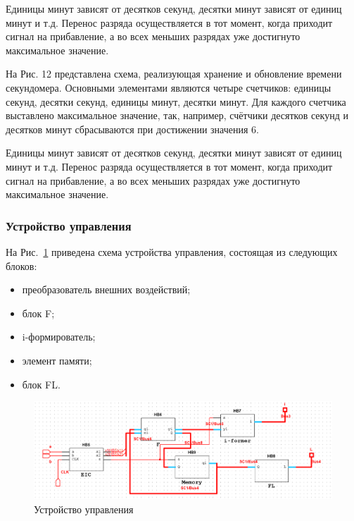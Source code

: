 \documentclass[a4paper, final]{article}
\begin{document}
\newpage

\newpage

Единицы минут зависят от десятков секунд, десятки минут зависят от единиц минут и т.д. Перенос разряда осуществляется в тот момент, когда приходит сигнал на прибавление, а во всех меньших разрядах уже достигнуто максимальное значение.

На Рис. 12 представлена схема, реализующая хранение и обновление времени секундомера. Основными элементами являются четыре счетчиков: единицы секунд, десятки секунд, единицы минут, десятки минут. Для каждого счетчика выставлено максимальное значение, так, например, счётчики десятков секунд и десятков минут сбрасываются при достижении значения 6.

\newpage

\newpage

Единицы минут зависят от десятков секунд, десятки минут зависят от единиц минут и т.д. Перенос разряда осуществляется в тот момент, когда приходит сигнал на прибавление, а во всех меньших разрядах уже достигнуто максимальное значение.

\subsubsection{Устройство управления}
На Рис.~\ref{img:control_device} приведена схема устройства управления, состоящая из следующих блоков:
\begin{itemize}
  \item преобразователь внешних воздействий;
  \item блок F;
  \item i-формирователь;
  \item элемент памяти;
  \item блок FL.
\end{itemize}

\begin{figure}[H]
   \centering
   \includegraphics[width=\linewidth]{control_device.png}
   \caption{Устройство управления}
   \label{img:control_device}
\end{figure}
\end{document}
